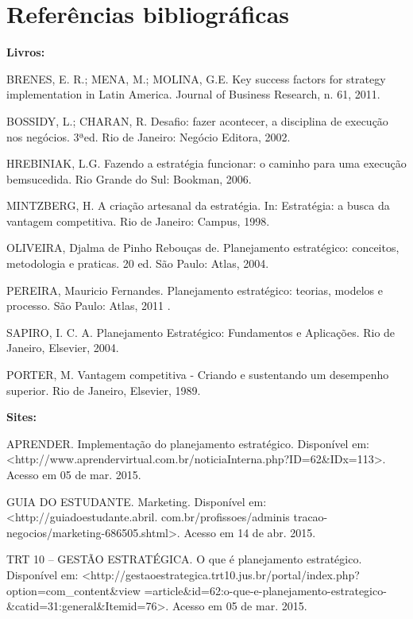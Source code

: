 \documentclass[
	12pt,				%
	openright,			%
	oneside,			%
	a4paper,			%
	english,			%
	french,				%
	spanish,			%
	brazil				%
	]{abntex2}
\begin{document}
\chapter[Referências bibliográficas]{Referências bibliográficas}

\textbf{Livros:}
	
BRENES, E. R.; MENA, M.; MOLINA, G.E. Key success factors for strategy implementation in Latin America. Journal of Business Research, n. 61, 2011.

BOSSIDY, L.; CHARAN, R. Desafio: fazer acontecer, a disciplina de execução nos negócios. 3ªed. Rio de Janeiro: Negócio Editora, 2002.

HREBINIAK, L.G. Fazendo a estratégia funcionar: o caminho para uma execução bemsucedida. Rio Grande do Sul: Bookman, 2006.

MINTZBERG, H. A criação artesanal da estratégia. In:  Estratégia: a busca da vantagem competitiva. Rio de Janeiro: Campus, 1998. 

OLIVEIRA, Djalma de Pinho Rebouças de. Planejamento estratégico: conceitos, metodologia e praticas. 20 ed. São Paulo: Atlas, 2004.

PEREIRA, Mauricio Fernandes. Planejamento estratégico: teorias, modelos e processo. São Paulo: Atlas, 2011	.
 
SAPIRO, I. C. A. Planejamento Estratégico: Fundamentos e Aplicações. Rio de Janeiro, Elsevier, 2004.

PORTER, M. Vantagem competitiva - Criando e sustentando um desempenho superior. Rio de Janeiro, Elsevier, 1989.

	\textbf{Sites:}
	
	APRENDER. Implementação do planejamento estratégico. Disponível em: \linebreak <http://www.aprendervirtual.com.br/noticiaInterna.php?ID=62\&IDx=113>. Acesso em 05 de mar. 2015.
	
	GUIA DO ESTUDANTE. Marketing. Disponível em: <http://guiadoestudante.abril. com.br/profissoes/adminis tracao-negocios/marketing-686505.shtml>. Acesso em 14 de abr. 2015.
	
	TRT 10 – GESTÃO ESTRATÉGICA. O que é planejamento estratégico. Disponível em: <http://gestaoestrategica.trt10.jus.br/portal/index.php?option=com\_content\&view =article\&id=62:o-que-e-planejamento-estrategico-\&catid=31:general\&Itemid=76>. Acesso em 05 de mar. 2015.
	
\end{document}

